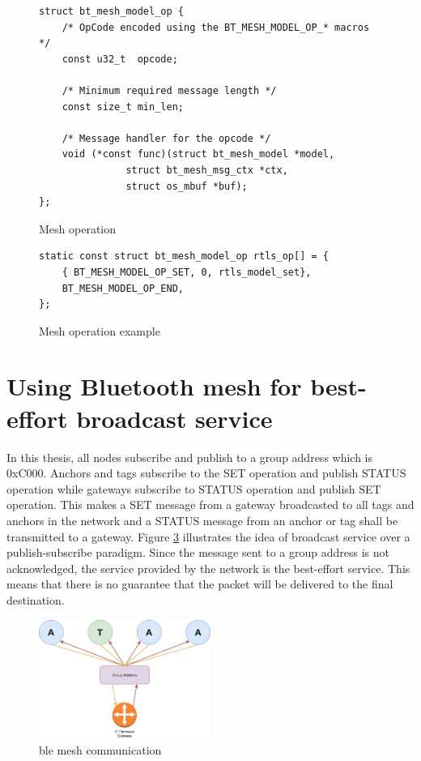 \documentclass[\main/main.tex]{subfiles}
\begin{document}
\begin{figure}[H]
    \begin{lstlisting}[style=CStyle]
struct bt_mesh_model_op {
	/* OpCode encoded using the BT_MESH_MODEL_OP_* macros */
	const u32_t  opcode;

	/* Minimum required message length */
	const size_t min_len;

	/* Message handler for the opcode */
	void (*const func)(struct bt_mesh_model *model,
			   struct bt_mesh_msg_ctx *ctx,
			   struct os_mbuf *buf);
};
    \end{lstlisting}
    \caption{Mesh operation}
    \label{fig:mesh_model_operation}
\end{figure}

\begin{figure}[H]
    \begin{lstlisting}[style=CStyle]
static const struct bt_mesh_model_op rtls_op[] = {
    { BT_MESH_MODEL_OP_SET, 0, rtls_model_set},
    BT_MESH_MODEL_OP_END,
};
\end{lstlisting}
\caption{Mesh operation example}
\label{fig:mesh_model_operation_example}
\end{figure}

\section{Using Bluetooth mesh for best-effort broadcast service}
\label{sec:using_bluetooth_mesh_for_best_effort_broadcast_service}
In this thesis, all nodes subscribe and publish to a group address which is 0xC000. Anchors and tags subscribe to the SET operation and publish STATUS operation while gateways subscribe to STATUS operation and publish SET operation. This makes a SET message from a gateway broadcasted to all tags and anchors in the network and a STATUS message from an anchor or tag shall be transmitted to a gateway. Figure \ref{fig:ble_mesh_comunication} illustrates the idea of broadcast service over a publish-subscribe paradigm. Since the message sent to a group address is not acknowledged, the service provided by the network is the best-effort service. This means that there is no guarantee that the packet will be delivered to the final destination. 

\begin{figure}[H]
    \begin{center}
        \includegraphics[width=0.5\textwidth]{ble_mesh_comunication.png}
    \end{center}
    \caption{ble mesh communication}
    \label{fig:ble_mesh_comunication}
\end{figure}
\end{document}
